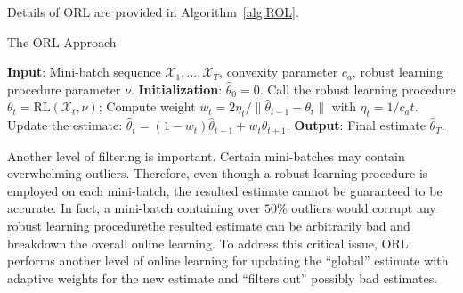 \documentclass[11pt]{article}
\begin{document}
Details of ORL are provided in Algorithm~\ref{alg:ROL}.
\begin{algorithm}[t]
	\caption{The ORL Approach}
	\label{alg:ROL}
	\begin{algorithmic}
		\STATE \textbf{Input}: %
		 Mini-batch sequence $\mathcal{X}_1,\ldots,\mathcal{X}_T$,
		convexity parameter $ c_a $,  robust learning procedure parameter $\nu$.
		\STATE \textbf{Initialization}: $ \widehat{\theta}_0= 0  $.
		\STATE Call the robust learning procedure $\theta_t = \mathrm{RL}(\mathcal{X}_t, \nu)$;
		\STATE Compute weight $w_t = 2\eta_t/\|\widehat{\theta}_{t-1} - \theta_{t}\|$ with $\eta_t = 1/c_a t$.
		\STATE Update the estimate: $\widehat{\theta}_{t}=(1-w_t)\widehat{\theta}_{t-1} + w_t \theta_{t+1}$.
		\ENDFOR
		\STATE \textbf{Output}:  Final estimate $\widehat{\theta}_T$. %
	\end{algorithmic}
\end{algorithm}
Another level of filtering is important. Certain mini-batches may contain overwhelming outliers. Therefore, even though a robust learning procedure is employed on each mini-batch, the resulted estimate cannot be guaranteed to be accurate. In fact, a mini-batch containing over $50\%$ outliers would corrupt any robust learning procedure\textemdash the resulted estimate can be arbitrarily bad and breakdown the overall online learning. To address this critical issue,  ORL performs another level of online learning for updating the ``global'' estimate with adaptive weights for the new estimate and ``filters out'' possibly bad estimates.
\end{document}
